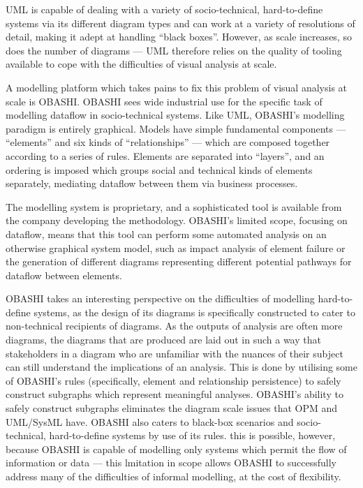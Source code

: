 \documentclass[draft]{report}
\begin{document}
UML is capable of dealing with a variety of socio-technical, hard-to-define
systems via its different diagram types and can work at a variety of resolutions
of detail, making it adept at handling ``black boxes''. However, as scale
increases, so does the number of diagrams --- UML therefore relies on the
quality of tooling available to cope with the difficulties of visual analysis at
scale.\par

A modelling platform which takes pains to fix this problem of visual analysis at
scale is OBASHI\cite{obashi_methodology}. OBASHI sees wide industrial use for
the specific task of modelling dataflow in socio-technical systems. Like UML,
OBASHI's modelling paradigm is entirely graphical. Models have simple
fundamental components --- ``elements'' and six kinds of ``relationships'' ---
which are composed together according to a series of rules. Elements are
separated into ``layers'', and an ordering is imposed which groups social and
technical kinds of elements separately, mediating dataflow between them via
business processes.\par

The modelling system is proprietary, and a sophisticated tool is available from
the company developing the methodology. OBASHI's limited scope, focusing on
dataflow, means that this tool can perform some automated analysis on an
otherwise graphical system model, such as impact analysis of element failure or
the generation of different diagrams representing different potential pathways
for dataflow between elements.\par

OBASHI takes an interesting perspective on the difficulties of modelling
hard-to-define systems, as the design of its diagrams is specifically
constructed to cater to non-technical recipients of diagrams. As the outputs of
analysis are often more diagrams, the diagrams that are produced are laid out in
such a way that stakeholders in a diagram who are unfamiliar with the nuances of
their subject can still understand the implications of an analysis. This is done
by utilising some of OBASHI's rules (specifically, element and relationship
persistence) to safely construct subgraphs which represent meaningful analyses.
OBASHI's ability to safely construct subgraphs eliminates the diagram scale
issues that OPM and UML/SysML have. OBASHI also caters to black-box scenarios
and socio-technical, hard-to-define systems by use of its rules. this is
possible, however, because OBASHI is capable of modelling only systems which
permit the flow of information or data --- this lmitation in scope allows OBASHI
to successfully address many of the difficulties of informal modelling, at the
cost of flexibility.\par
\end{document}
